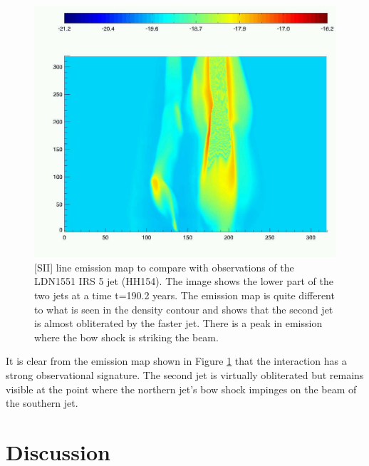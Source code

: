 


\begin{figure}[t]
\centering
\includegraphics[width=\textwidth]{sii}
\caption{
 [SII] line emission map to compare with observations of the LDN1551 IRS 5 jet (HH154).
 The image shows the lower part of the two jets at a time t=190.2 years.
 The emission map is quite different to what is seen in the density contour and shows that the second jet is almost obliterated by the faster jet. There is a peak in emission where the bow shock is striking the beam.
}
\label{fig:4-21} 
\end{figure}


It is clear from the emission map shown in Figure \ref{fig:4-21} that the interaction has a strong observational signature. The second jet is virtually obliterated but remains visible at the point where the northern jet's bow shock impinges on the beam of the southern jet.



\section{Discussion}\label{Discussion}

